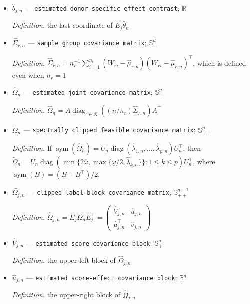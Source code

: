 \documentclass{article}
\begin{document}
\begin{itemize}
  \item \(\widehat b_{j,n}\) --- \texttt{estimated donor-\allowbreak{}specific effect contrast}; \(\mathbb R\)
  \par\smallskip\noindent\emph{Definition.} the last coordinate of \(E_j\widehat\theta_n\)
  \item \(\widehat\Sigma_{r,n}\) --- \texttt{sample group covariance matrix}; \(\mathbb S_+^d\)
  \par\smallskip\noindent\emph{Definition.} \(\widehat\Sigma_{r,n}=n_r^{-1}\sum_{i=1}^{n_r}(W_{ri}-\widehat\mu_{r,n})(W_{ri}-\widehat\mu_{r,n})^{\top}\), which is defined even when \(n_r=1\)
  \item \(\widehat\Omega_n\) --- \texttt{estimated joint covariance matrix}; \(\mathbb S_+^p\)
  \par\smallskip\noindent\emph{Definition.} \(\widehat\Omega_n=A\operatorname{diag}_{r\in\mathcal R}((n/n_r)\widehat\Sigma_{r,n})A^{\top}\)
  \item \(\widetilde\Omega_n\) --- \texttt{spectrally clipped feasible covariance matrix}; \(\mathbb S_{++}^p\)
  \par\smallskip\noindent\emph{Definition.} If \(\operatorname{sym}(\widehat\Omega_n)=U_n\operatorname{diag}(\widehat\lambda_{1,n},\ldots,\widehat\lambda_{p,n})U_n^{\top}\), then \(\widetilde\Omega_n=U_n\operatorname{diag}(\min\{2\overline\omega,\max\{\underline\omega/2,\widehat\lambda_{k,n}\}\}:1\le k\le p)U_n^{\top}\), where \(\operatorname{sym}(B)=(B+B^{\top})/2\).
  \item \(\widehat\Omega_{j,n}\) --- \texttt{clipped label-\allowbreak{}block covariance matrix}; \(\mathbb S_{++}^{q+1}\)
  \par\smallskip\noindent\emph{Definition.} \(\widehat\Omega_{j,n}=E_j\widetilde\Omega_nE_j^{\top}=\begin{pmatrix}\widehat V_{j,n}&\widehat u_{j,n}\\\widehat u_{j,n}^{\top}&\widehat v_{j,n}\end{pmatrix}\)
  \item \(\widehat V_{j,n}\) --- \texttt{estimated score covariance block}; \(\mathbb S_+^q\)
  \par\smallskip\noindent\emph{Definition.} the upper-left block of \(\widehat\Omega_{j,n}\)
  \item \(\widehat u_{j,n}\) --- \texttt{estimated score-\allowbreak{}effect covariance block}; \(\mathbb R^q\)
  \par\smallskip\noindent\emph{Definition.} the upper-right block of \(\widehat\Omega_{j,n}\)

\end{itemize}
\end{document}
